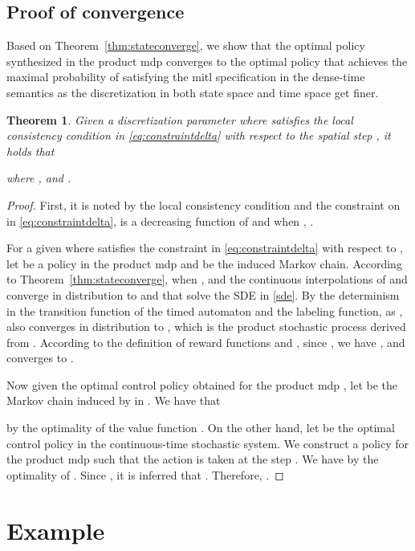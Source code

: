 \documentclass[letterpaper, 10 pt, conference]{ieeeconf}
\newtheorem{theorem}{Theorem}
\begin{document}
 \subsection{Proof of convergence}
Based on Theorem~\ref{thm:stateconverge}, we show that the optimal
 policy synthesized in the product \ac{mdp} converges to the
 optimal policy that achieves the maximal probability of satisfying
 the \ac{mitl} specification in the dense-time semantics as the
 discretization in both state space and time space get finer.
\begin{theorem}
  Given a discretization parameter  where 
  satisfies the local consistency condition in
  \eqref{eq:constraintdelta} with respect to the spatial step , it
  holds that
  
where ,  and
.
\end{theorem}

\begin{proof}
  First, it is noted by the local consistency condition and the
  constraint on  in \eqref{eq:constraintdelta},  is a
  decreasing function of  and when ,
  .
 

  For a given  where  satisfies the constraint
  in \eqref{eq:constraintdelta} with respect to , let
   be a policy in the product \ac{mdp}
   and  be the induced Markov chain.
  According to Theorem~\ref{thm:stateconverge}, when
  ,  and the continuous
  interpolations of  and
   converge in distribution to
   and  that solve the SDE in \eqref{sde}. By the
  determinism in the transition function of the timed automaton and
  the labeling function, as , 
  also converges in distribution to , which is the
  product stochastic process derived from .
  According to the definition of reward functions  and , since
  , we have ,
   and 
  converges to .


  Now given the optimal control policy 
  obtained for the product \ac{mdp} , let
   be the Markov chain induced by  in
  . We have that
  
  by the optimality of the value function .  On the other
  hand, let  be the optimal
  control policy in the continuous-time stochastic system.  We
  construct a policy  for the
  product \ac{mdp}  such that the action 
  is taken at the step .  We have
   by the
  optimality of .  Since
  ,
  it is inferred that
  . Therefore,
  .
\end{proof}
\section{Example}
\end{document}

